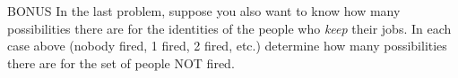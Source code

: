 \documentclass[addpoints, 12pt]{exam}
\begin{document}
\begin{questions}

\question BONUS In the last problem, suppose you also want to know how many possibilities there are for the identities of the people who \emph{keep} their jobs.  In each case above (nobody fired, 1 fired, 2 fired, etc.) determine how many possibilities there are for the set of people NOT fired. 



\end{questions} 
\end{document}
